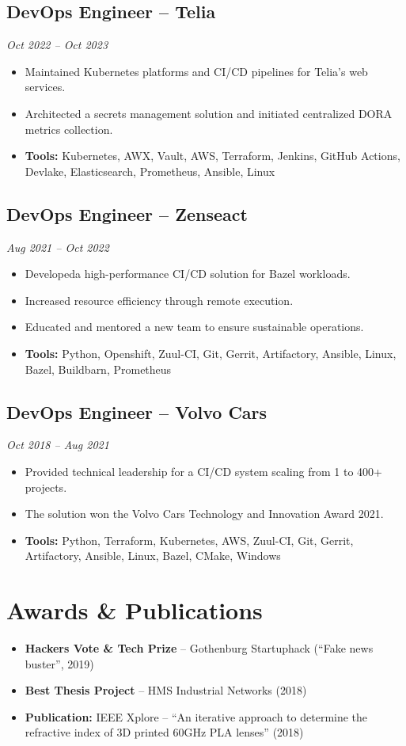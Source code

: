 \documentclass[11pt,a4paper]{article}
\begin{document}
\subsection{DevOps Engineer -- Telia}
\textit{Oct 2022 -- Oct 2023}
\begin{itemize}[leftmargin=*]
    \item Maintained Kubernetes platforms and CI/CD pipelines for Telia's web services.
    \item Architected a secrets management solution and initiated centralized DORA metrics collection.
    \item \textbf{Tools:} Kubernetes, AWX, Vault, AWS, Terraform, Jenkins, GitHub Actions, Devlake, Elasticsearch, Prometheus, Ansible, Linux
\end{itemize}

\subsection{DevOps Engineer -- Zenseact}
\textit{Aug 2021 -- Oct 2022}
\begin{itemize}[leftmargin=*]
    \item Developeda high-performance CI/CD solution for Bazel workloads.
    \item Increased resource efficiency through remote execution.
    \item Educated and mentored a new team to ensure sustainable operations.
    \item \textbf{Tools:} Python, Openshift, Zuul-CI, Git, Gerrit, Artifactory, Ansible, Linux, Bazel, Buildbarn, Prometheus
\end{itemize}

\subsection{DevOps Engineer -- Volvo Cars}
\textit{Oct 2018 -- Aug 2021}
\begin{itemize}[leftmargin=*]
    \item Provided technical leadership for a CI/CD system scaling from 1 to 400+ projects.
    \item The solution won the Volvo Cars Technology and Innovation Award 2021.
    \item \textbf{Tools:} Python, Terraform, Kubernetes, AWS, Zuul-CI, Git, Gerrit, Artifactory, Ansible, Linux, Bazel, CMake, Windows
\end{itemize}

\section{Awards \& Publications}
\begin{itemize}[leftmargin=*]
    \item \textbf{Hackers Vote \& Tech Prize} -- Gothenburg Startuphack (``Fake news buster'', 2019)
    \item \textbf{Best Thesis Project} -- HMS Industrial Networks (2018)
    \item \textbf{Publication:} IEEE Xplore -- ``An iterative approach to determine the refractive index of 3D printed 60GHz PLA lenses'' (2018)
\end{itemize}
\end{document}
